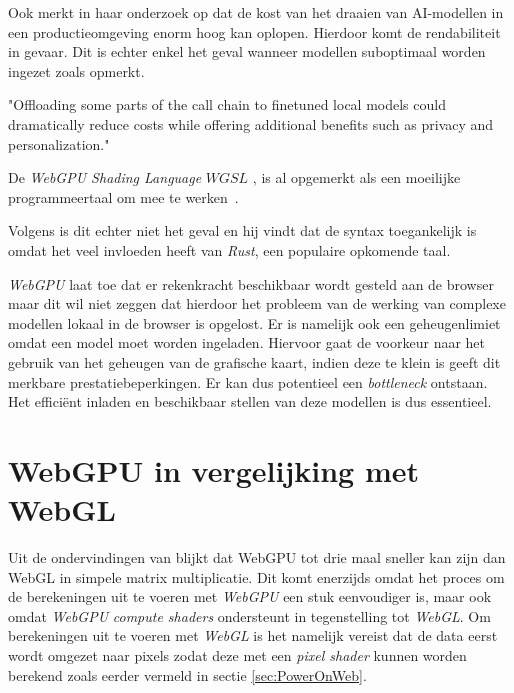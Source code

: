 \bigbreak{}

Ook \textcite{Huyen2023} merkt in haar onderzoek op dat de kost van het draaien van AI-modellen in een productieomgeving enorm hoog kan oplopen. Hierdoor komt de rendabiliteit in gevaar. Dit is echter enkel het geval wanneer modellen suboptimaal worden ingezet zoals \textcite{Fleetwood2023a} opmerkt.

\begin{displayquote}
    "Offloading some parts of the call chain to finetuned local models could dramatically reduce costs while offering additional benefits such as privacy and personalization."
\end{displayquote}

\bigbreak{}

De \textit{WebGPU Shading Language} \(\textit{WGSL}\) \autocite{W3C2024}, is al opgemerkt als een moeilijke programmeertaal om mee te werken~\autocite{Madrigal2023, Ashton2020}.

Volgens \textcite{Fleetwood2023a} is dit echter niet het geval en hij vindt dat de syntax toegankelijk is omdat het veel invloeden heeft van \textit{Rust}, een populaire opkomende taal.

\bigbreak{}

\textit{WebGPU} laat toe dat er rekenkracht beschikbaar wordt gesteld aan de browser maar dit wil niet zeggen dat hierdoor het probleem van de werking van complexe modellen lokaal in de browser is opgelost. Er is namelijk ook een geheugenlimiet omdat een model moet worden ingeladen. Hiervoor gaat de voorkeur naar het gebruik van het geheugen van de grafische kaart, indien deze te klein is geeft dit merkbare prestatiebeperkingen. Er kan dus potentieel een \textit{bottleneck} ontstaan. Het efficiënt inladen en beschikbaar stellen van deze modellen is dus essentieel.

\section{WebGPU in vergelijking met WebGL}

Uit de ondervindingen van \textcite{Radin2021} blijkt dat WebGPU tot drie maal sneller kan zijn dan WebGL in simpele matrix multiplicatie. Dit komt enerzijds omdat het proces om de berekeningen uit te voeren met \textit{WebGPU} een stuk eenvoudiger is, maar ook omdat \textit{WebGPU} \textit{compute shaders} ondersteunt in tegenstelling tot \textit{WebGL}. Om berekeningen uit te voeren met \textit{WebGL} is het namelijk vereist dat de data eerst wordt omgezet naar pixels zodat deze met een \textit{pixel shader} kunnen worden berekend zoals eerder vermeld in sectie \ref{sec:PowerOnWeb}. 

